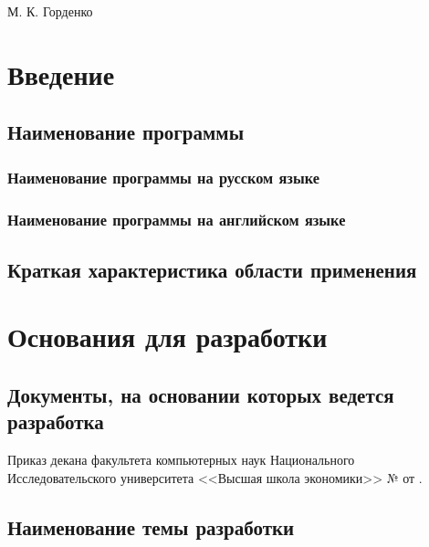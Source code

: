 \documentclass[a4paper,12pt,reqno]{article}
\begin{document}
	
	
	
	
	
	{М. К. Горденко}
	
	\firstPage
						\newpage
	\secondPage
						\newpage
	\thirdPage
						\newpage
	\section{Введение}
	\subsection{Наименование программы}
	\subsubsection{Наименование программы на русском языке}
	{\color{red}{TODO}}
	\subsubsection{Наименование программы на английском языке}
	{\color{red}{TODO}}
	\subsection{Краткая характеристика области применения}
	
	\newpage
	\section{Основания для разработки}
	\subsection{Документы, на основании которых ведется разработка}
	
	
	Приказ декана факультета компьютерных наук Национального Исследовательского университета <<Высшая школа экономики>> № {\color{red}{TODO}} от {\color{red}{TODO}}.
	
	\subsection{Наименование темы разработки}
	
\end{document}
